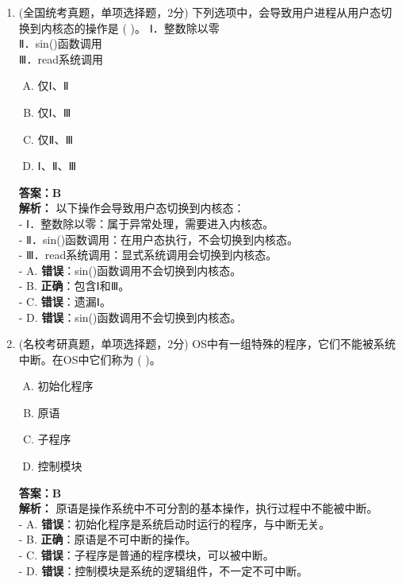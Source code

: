 \documentclass[lang=cn,newtx,10pt,scheme=chinese]{../../elegantbook}
\begin{document}
\begin{enumerate}
    \item (全国统考真题，单项选择题，2分) 下列选项中，会导致用户进程从用户态切换到内核态的操作是 (    )。
    Ⅰ．整数除以零\\
    Ⅱ．sin()函数调用\\
    Ⅲ．read系统调用\\
    \begin{enumerate}[A.]
        \item 仅Ⅰ、Ⅱ
        \item 仅Ⅰ、Ⅲ
        \item 仅Ⅱ、Ⅲ
        \item Ⅰ、Ⅱ、Ⅲ
    \end{enumerate}
    \textbf{答案：B}\\
    \textbf{解析：} 以下操作会导致用户态切换到内核态：\\
    - Ⅰ．整数除以零：属于异常处理，需要进入内核态。\\
    - Ⅱ．sin()函数调用：在用户态执行，不会切换到内核态。\\
    - Ⅲ．read系统调用：显式系统调用会切换到内核态。\\
    - A. \textbf{错误}：sin()函数调用不会切换到内核态。\\
    - B. \textbf{正确}：包含Ⅰ和Ⅲ。\\
    - C. \textbf{错误}：遗漏Ⅰ。\\
    - D. \textbf{错误}：sin()函数调用不会切换到内核态。\\

\item (名校考研真题，单项选择题，2分) OS中有一组特殊的程序，它们不能被系统中断。在OS中它们称为 (    )。
    \begin{enumerate}[A.]
        \item 初始化程序
        \item 原语
        \item 子程序
        \item 控制模块
    \end{enumerate}
    \textbf{答案：B}\\
    \textbf{解析：} 原语是操作系统中不可分割的基本操作，执行过程中不能被中断。\\
    - A. \textbf{错误}：初始化程序是系统启动时运行的程序，与中断无关。\\
    - B. \textbf{正确}：原语是不可中断的操作。\\
    - C. \textbf{错误}：子程序是普通的程序模块，可以被中断。\\
    - D. \textbf{错误}：控制模块是系统的逻辑组件，不一定不可中断。\\


\end{enumerate}
\end{document}
